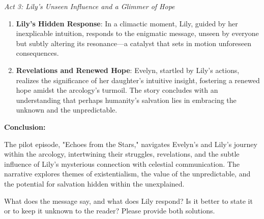 \begin{aquote}
    \noindent\emph{Act 3: Lily's Unseen Influence and a Glimmer of Hope}
    \begin{enumerate}
        \item \textbf{Lily's Hidden Response}: In a climactic moment, Lily, guided by her inexplicable intuition, responds to the enigmatic message, unseen by everyone but subtly altering its resonance—a catalyst that sets in motion unforeseen consequences.
        \item \textbf{Revelations and Renewed Hope}: Evelyn, startled by Lily's actions, realizes the significance of her daughter's intuitive insight, fostering a renewed hope amidst the arcology's turmoil. The story concludes with an understanding that perhaps humanity's salvation lies in embracing the unknown and the unpredictable.
    \end{enumerate}

    \noindent\textbf{Conclusion:}\medskip

    The pilot episode, "Echoes from the Stars," navigates Evelyn's and Lily's journey within the arcology, intertwining their struggles, revelations, and the subtle influence of Lily's mysterious connection with celestial communication. The narrative explores themes of existentialism, the value of the unpredictable, and the potential for salvation hidden within the unexplained.
\end{aquote}

\begin{qquote}
    What does the message say, and what does Lily respond? Is it better to state it or to keep it unknown to the reader? Please provide both solutions.
\end{qquote}

